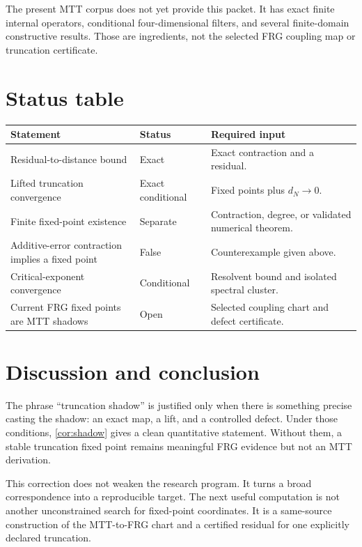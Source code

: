 \documentclass[11pt]{article}
\theoremstyle{definition}
\theoremstyle{remark}
\begin{document}
The present MTT corpus does not yet provide this packet. It has exact finite
internal operators, conditional four-dimensional filters, and several
finite-domain constructive results. Those are ingredients, not the selected
FRG coupling map or truncation certificate.

\section{Status table}

\begin{center}
\begin{tabularx}{\textwidth}{@{}
>{\raggedright\arraybackslash}p{}
>{\raggedright\arraybackslash}p{}
>{\raggedright\arraybackslash}X@{}}
\toprule
Statement & Status & Required input\\
\midrule
Residual-to-distance bound & Exact &
Exact contraction and a residual.\\
Lifted truncation convergence & Exact conditional &
Fixed points plus \(d_N\to0\).\\
Finite fixed-point existence & Separate &
Contraction, degree, or validated numerical theorem.\\
Additive-error contraction implies a fixed point & False &
Counterexample given above.\\
Critical-exponent convergence & Conditional &
Resolvent bound and isolated spectral cluster.\\
Current FRG fixed points are MTT shadows & Open &
Selected coupling chart and defect certificate.\\
\bottomrule
\end{tabularx}
\end{center}

\section{Discussion and conclusion}

The phrase ``truncation shadow'' is justified only when there is something
precise casting the shadow: an exact map, a lift, and a controlled defect.
Under those conditions, \autoref{cor:shadow} gives a clean quantitative
statement. Without them, a stable truncation fixed point remains meaningful
FRG evidence but not an MTT derivation.

This correction does not weaken the research program. It turns a broad
correspondence into a reproducible target. The next useful computation is
not another unconstrained search for fixed-point coordinates. It is a
same-source construction of the MTT-to-FRG chart and a certified residual
for one explicitly declared truncation.
\end{document}
